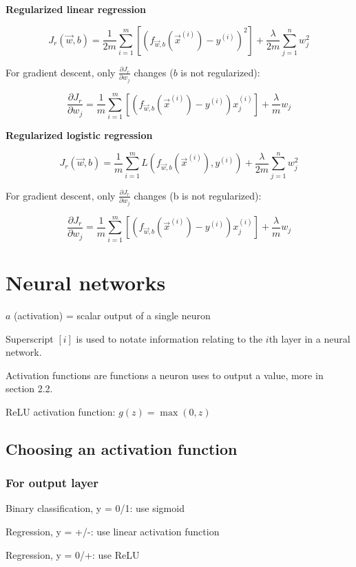 \documentclass[12pt]{article}
\begin{document}
\noindent \textbf{Regularized linear regression}

\[ J_r(\vec{w},b) = \frac{1}{2m} \sum_{i=1}^m \left[(f_{\vec{w},b}(\vec{x}^{(i)}) - y^{(i)})^2\right] + \frac{\lambda}{2m} \sum_{j=1}^n w_j^2 \]

For gradient descent, only $\frac{\partial J_r}{\partial w_j}$ changes ($b$ is not regularized):

\[ \frac{\partial J_r}{\partial w_j} = \frac{1}{m} \sum_{i=1}^m \left[(f_{\vec{w},b}(\vec{x}^{(i)}) - y^{(i)})x_j^{(i)}\right] + \frac{\lambda}{m} w_j \]

\noindent \textbf{Regularized logistic regression}

\[ J_r(\vec{w},b) = \frac{1}{m} \sum_{i=1}^m L(f_{\vec{w},b}(\vec{x}^{(i)}), y^{(i)}) + \frac{\lambda}{2m} \sum_{j=1}^n w_j^2 \]

For gradient descent, only $\frac{\partial J_r}{\partial w_j}$ changes (b is not regularized):

\[ \frac{\partial J_r}{\partial w_j} = \frac{1}{m} \sum_{i=1}^m \left[(f_{\vec{w},b}(\vec{x}^{(i)}) - y^{(i)})x_j^{(i)}\right] + \frac{\lambda}{m} w_j \]

\pagebreak

\section{Neural networks}

$a$ (activation) = scalar output of a single neuron

Superscript $[i]$ is used to notate information relating to the $i$th layer in a neural network.

Activation functions are functions a neuron uses to output a value, more in section 2.2.

ReLU activation function: $g(z) = \max(0, z)$

\subsection{Choosing an activation function}

\subsubsection*{For output layer}

Binary classification, y = 0/1: use sigmoid

Regression, y = +/-: use linear activation function

Regression, y = 0/+: use ReLU
\end{document}
